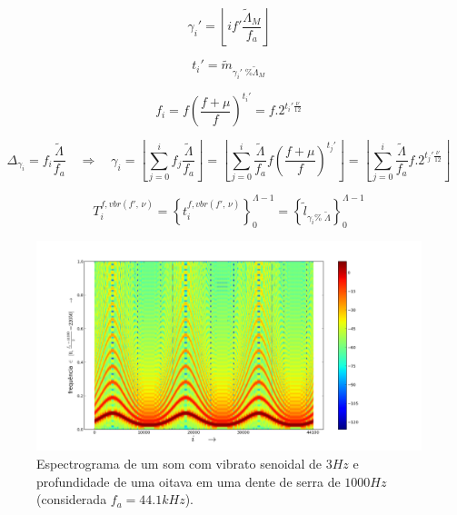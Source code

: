 \begin{equation}\label{vbrGamma}
\gamma_i'=\left \lfloor i f' \frac{\widetilde{\Lambda}_M}{f_a} \right \rfloor
\end{equation}

\begin{equation}\label{vbrAux}
t_i'=\widetilde{m}_{\gamma_i' \;\% \widetilde{\Lambda}_M}
\end{equation}

\begin{equation}\label{vbrF}
f_i=f \left ( \frac{f + \mu }{f} \right )^{t_i'}=f . 2^{t_i'\frac{\nu}{12}}
\end{equation}

\begin{equation}\label{vbrGamma2}
\Delta_{\gamma_i}=f_i\frac{\widetilde{\Lambda}}{f_a} \quad \Rightarrow \quad \gamma_i = \left \lfloor \sum_{j=0}^{i} f_j \frac{\widetilde{\Lambda}}{f_a} \right \rfloor = \left \lfloor \sum_{j=0}^{i} \frac{\widetilde{\Lambda}}{f_a}f \left ( \frac{f + \mu }{f} \right )^{t_j'}  \right \rfloor= \left \lfloor \sum_{j=0}^{i} \frac{\widetilde{\Lambda}}{f_a}f . 2^{t_j'\frac{\nu}{12}}  \right \rfloor
\end{equation}

\begin{equation}\label{vbrT}
T_i^{f, vbr(f',\,\nu)}=\left\{ t_i^{f,vbr(f',\,\nu)} \right\}_0^{\Lambda-1}=\left\{ \widetilde{l}_{\gamma_i \%\; \widetilde{\Lambda} } \right\}_0^{\Lambda-1}
\end{equation}


\begin{figure}[h!]
    \centering
        \includegraphics[width=\textwidth]{figuras/vibrato___}
    \caption{Espectrograma de um som com vibrato senoidal de $3Hz$ e profundidade de uma oitava em uma dente de serra de $1000Hz$ (considerada $f_a=44.1kHz$).}
        \label{fig:vibrato}
\end{figure}

